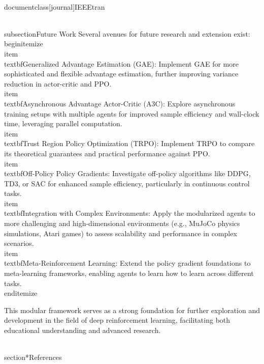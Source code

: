 \\documentclass[journal]{IEEEtran}
\begin{document}
\\subsection{Future Work}
Several avenues for future research and extension exist:
\\begin{itemize}
    \\item \\textbf{Generalized Advantage Estimation (GAE)}: Implement GAE \cite{schulman2015highdimensional} for more sophisticated and flexible advantage estimation, further improving variance reduction in actor-critic and PPO.
    \\item \\textbf{Asynchronous Advantage Actor-Critic (A3C)}: Explore asynchronous training setups with multiple agents for improved sample efficiency and wall-clock time, leveraging parallel computation.
    \\item \\textbf{Trust Region Policy Optimization (TRPO)}: Implement TRPO \cite{schulman2015trust} to compare its theoretical guarantees and practical performance against PPO.
    \\item \\textbf{Off-Policy Policy Gradients}: Investigate off-policy algorithms like DDPG, TD3, or SAC for enhanced sample efficiency, particularly in continuous control tasks.
    \\item \\textbf{Integration with Complex Environments}: Apply the modularized agents to more challenging and high-dimensional environments (e.g., MuJoCo physics simulations, Atari games) to assess scalability and performance in complex scenarios.
    \\item \\textbf{Meta-Reinforcement Learning}: Extend the policy gradient foundations to meta-learning frameworks, enabling agents to learn how to learn across different tasks.
\\end{itemize}

This modular framework serves as a strong foundation for further exploration and development in the field of deep reinforcement learning, facilitating both educational understanding and advanced research.

\\section*{References}
\
\
\end{document}
